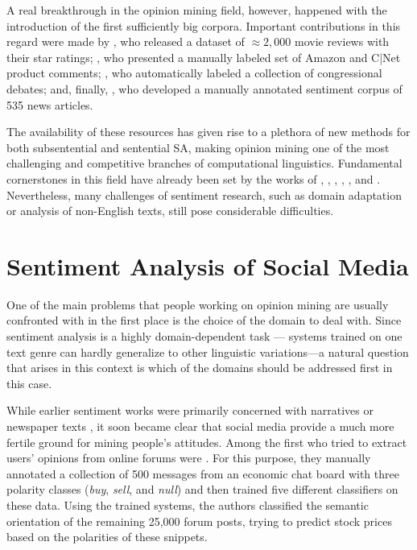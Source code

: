 A real breakthrough in the opinion mining field, however, happened
with the introduction of the first sufficiently big corpora.
Important contributions in this regard were made by
\citet{Pang:04,Pang:05}, who released a dataset of $\approx2,000$
movie reviews with their star ratings; \citet{Hu:04}, who presented a
manually labeled set of Amazon and C|Net product comments;
\citet{Thomas:06}, who automatically labeled a collection of
congressional debates; and, finally, \citet{Wiebe:05}, who developed a
manually annotated sentiment corpus of 535 news articles.

The availability of these resources has given rise to a plethora of
new methods for both subsentential and sentential SA, making opinion
mining one of the most challenging and competitive branches of
computational linguistics.  Fundamental cornerstones in this field
have already been set by the works of \citet{Pang:02},
\citet{Wiebe:05}, \citet{Wilson:05}, \citet{Breck:07},
\citet{Choi:09,Choi:10}, and \citet{Socher:11, Socher:12}.
Nevertheless, many challenges of sentiment research, such as domain
adaptation or analysis of non-English texts, still pose considerable
difficulties.

\section{Sentiment Analysis of Social Media}

One of the main problems that people working on opinion mining are
usually confronted with in the first place is the choice of the domain
to deal with. Since sentiment analysis is a highly domain-dependent
task \citep[see][]{Aue:05,Blitzer:07,Li:08}---\ie{} systems trained on
one text genre can hardly generalize to other linguistic
variations---a natural question that arises in this context is which
of the domains should be addressed first in this case.

While earlier sentiment works were primarily concerned with narratives
\citep{Wiebe:90a,Wiebe:94} or newspaper texts
\citep{Wiebe:03,Wiebe:05,Bautin:08}, it soon became clear that social
media provide a much more fertile ground for mining people's
attitudes.  Among the first who tried to extract users' opinions from
online forums were \citet{Das:01}. For this purpose, they manually
annotated a collection of 500 messages from an economic chat board
with three polarity classes (\emph{buy}, \emph{sell}, and \emph{null})
and then trained five different classifiers on these data.  Using the
trained systems, the authors classified the semantic orientation of
the remaining 25,000 forum posts, trying to predict stock prices based
on the polarities of these snippets.

